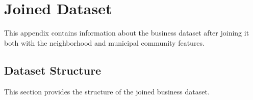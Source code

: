 \section{Joined Dataset}

This appendix contains information about the business dataset after joining it both with the neighborhood and municipal community features. 

\subsection{Dataset Structure}

This section provides the structure of the joined business dataset.

